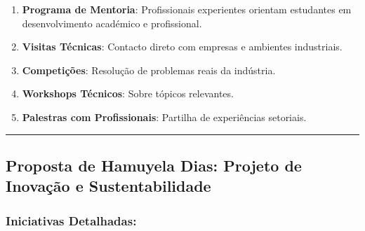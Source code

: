 \documentclass[12pt,a4paper]{article}
\begin{document}
\begin{enumerate}[itemsep=0.2cm]
    \item \textbf{Programa de Mentoria}: Profissionais experientes orientam estudantes em desenvolvimento académico e profissional.
    
    \item \textbf{Visitas Técnicas}: Contacto direto com empresas e ambientes industriais.
    
    \item \textbf{Competições}: Resolução de problemas reais da indústria.
    
    \item \textbf{Workshops Técnicos}: Sobre tópicos relevantes.
    
    \item \textbf{Palestras com Profissionais}: Partilha de experiências setoriais.
\end{enumerate}

\textcolor{spe-secondary}{\hspace{0.5cm}\rule{0.4\linewidth}{0.8pt}}
\subsection{Proposta de Hamuyela Dias: Projeto de Inovação e Sustentabilidade}

\subsubsection*{Iniciativas Detalhadas:}
\end{document}
